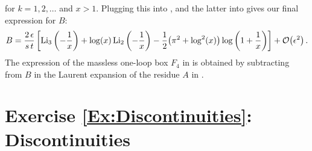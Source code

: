 for $k=1,2,\ldots$ and $x>1$. Plugging this into , and the latter into  gives our final expression for $B$:
\begin{align} \label{eq:MBboxBfinal}
B = \frac{2 \, \epsilon}{s\, t} \, \biggl[ \mathrm{Li}_3\left(-\frac{1}{x}\right) + \log(x) \, \mathrm{Li}_2\left(-\frac{1}{x}\right) -
  \frac{1}{2}\bigl(\pi^2 + \log^2(x)\bigr) \log\left(1+\frac{1}{x}\right) \biggr] + \mathcal{O}\bigl(\epsilon^2\bigr) \,.
\end{align}
The expression of the massless one-loop box $F_4$ in  is obtained by subtracting from $B$ in  the Laurent expansion of the residue $A$ in .




\section*{Exercise \ref{Ex:Discontinuities}: Discontinuities}
\label{Sol:Discontinuities}
